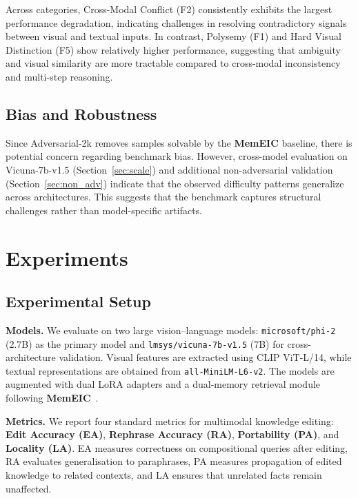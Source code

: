 \documentclass{article}
\newcommand{\memeic}{\textbf{MemEIC}}
\begin{document}
Across categories, Cross-Modal Conflict (F2) consistently exhibits the largest performance degradation, indicating challenges in resolving contradictory signals between visual and textual inputs. In contrast, Polysemy (F1) and Hard Visual Distinction (F5) show relatively higher performance, suggesting that ambiguity and visual similarity are more tractable compared to cross-modal inconsistency and multi-step reasoning.

\subsection{Bias and Robustness}

Since Adversarial-2k removes samples solvable by the \memeic{} baseline, there is potential concern regarding benchmark bias. However, cross-model evaluation on Vicuna-7b-v1.5 (Section~\ref{sec:scale}) and additional non-adversarial validation (Section~\ref{sec:non_adv}) indicate that the observed difficulty patterns generalize across architectures. This suggests that the benchmark captures structural challenges rather than model-specific artifacts.


\section{Experiments}

\subsection{Experimental Setup}
\label{sec:setup}

\textbf{Models.} We evaluate on two large vision--language models: \texttt{microsoft/phi-2} (2.7B) as the primary model and \texttt{lmsys/vicuna-7b-v1.5} (7B) for cross-architecture validation. Visual features are extracted using CLIP ViT-L/14, while textual representations are obtained from \texttt{all-MiniLM-L6-v2}. The models are augmented with dual LoRA adapters and a dual-memory retrieval module following \memeic{}~\cite{memeic2025}.

\textbf{Metrics.} We report four standard metrics for multimodal knowledge editing: \textbf{Edit Accuracy (EA)}, \textbf{Rephrase Accuracy (RA)}, \textbf{Portability (PA)}, and \textbf{Locality (LA)}. EA measures correctness on compositional queries after editing, RA evaluates generalisation to paraphrases, PA measures propagation of edited knowledge to related contexts, and LA ensures that unrelated facts remain unaffected.
\end{document}

